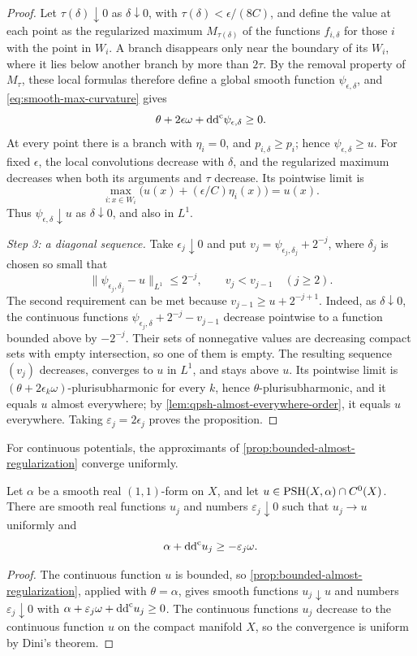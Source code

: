\begin{proof}
Let $\tau(\delta)\downarrow0$ as $\delta\downarrow0$, with $\tau(\delta)<\epsilon/(8C)$, and define the value at each point as the regularized maximum $M_{\tau(\delta)}$ of the functions $f_{i,\delta}$ for those $i$ with the point in $W_i$. A branch disappears only near the boundary of its $W_i$, where it lies below another branch by more than $2\tau$. By the removal property of $M_\tau$, these local formulas therefore define a global smooth function $\psi_{\epsilon,\delta}$, and \eqref{eq:smooth-max-curvature} gives
\[
 \theta+2\epsilon\omega+\mathrm{dd}^{\mathrm{c}}\psi_{\epsilon,\delta}\geq0.
\]
At every point there is a branch with $\eta_i=0$, and $p_{i,\delta}\geq p_i$; hence $\psi_{\epsilon,\delta}\geq u$. For fixed $\epsilon$, the local convolutions decrease with $\delta$, and the regularized maximum decreases when both its arguments and $\tau$ decrease. Its pointwise limit is
\[
 \max_{i:x\in W_i}\bigl(u(x)+(\epsilon/C)\eta_i(x)\bigr)=u(x).
\]
Thus $\psi_{\epsilon,\delta}\downarrow u$ as $\delta\downarrow0$, and also in $L^1$.

\emph{Step 3: a diagonal sequence.} Take $\epsilon_j\downarrow0$ and put
$v_j=\psi_{\epsilon_j,\delta_j}+2^{-j}$, where $\delta_j$ is chosen so small that
\[
 \|\psi_{\epsilon_j,\delta_j}-u\|_{L^1}\leq2^{-j},
 \qquad v_j<v_{j-1}\quad(j\geq2).
\]
The second requirement can be met because $v_{j-1}\geq u+2^{-j+1}$. Indeed, as $\delta\downarrow0$, the continuous functions
$\psi_{\epsilon_j,\delta}+2^{-j}-v_{j-1}$ decrease pointwise to a function bounded above by $-2^{-j}$. Their sets of nonnegative values are decreasing compact sets with empty intersection, so one of them is empty. The resulting sequence $(v_j)$ decreases, converges to $u$ in $L^1$, and stays above $u$. Its pointwise limit is $(\theta+2\epsilon_k\omega)$-plurisubharmonic for every $k$, hence $\theta$-plurisubharmonic, and it equals $u$ almost everywhere; by \cref{lem:qpsh-almost-everywhere-order}, it equals $u$ everywhere. Taking $\varepsilon_j=2\epsilon_j$ proves the proposition.
\end{proof}

For continuous potentials, the approximants of \cref{prop:bounded-almost-regularization} converge uniformly.

\begin{lemma}\label{lem:continuous-potential-smooth-loss}
Let $\alpha$ be a smooth real $(1,1)$-form on $X$, and let $u\in\mathrm{PSH}(X,\alpha)\cap C^0(X)$. There are smooth real functions $u_j$ and numbers $\varepsilon_j\downarrow0$ such that $u_j\to u$ uniformly and
\[
 \alpha+\mathrm{dd}^{\mathrm{c}} u_j\geq-\varepsilon_j\omega.
\]
\end{lemma}
\begin{proof}
The continuous function $u$ is bounded, so \cref{prop:bounded-almost-regularization}, applied with $\theta=\alpha$, gives smooth functions $u_j\downarrow u$ and numbers $\varepsilon_j\downarrow0$ with $\alpha+\varepsilon_j\omega+\mathrm{dd}^{\mathrm{c}} u_j\geq0$. The continuous functions $u_j$ decrease to the continuous function $u$ on the compact manifold $X$, so the convergence is uniform by Dini's theorem.
\end{proof}


